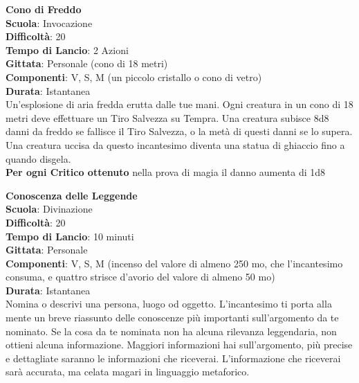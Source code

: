\begin{multicols}{2}
\medskip\textbf{Cono di Freddo}\\
\textbf{Scuola}: Invocazione\\
\textbf{Difficoltà}: 20\\
\textbf{Tempo di Lancio}: 2 Azioni\\
\textbf{Gittata}: Personale (cono di 18 metri)\\
\textbf{Componenti}: V, S, M (un piccolo cristallo o cono di vetro)\\
\textbf{Durata}: Istantanea\\
Un'esplosione di aria fredda erutta dalle tue mani. Ogni creatura in un cono di 18 metri deve effettuare un Tiro Salvezza su Tempra. Una creatura subisce 8d8 danni da freddo se fallisce il Tiro Salvezza, o la metà di questi danni se lo supera. Una creatura uccisa da questo incantesimo diventa una statua di ghiaccio fino a quando disgela.\\
\textbf{Per ogni Critico ottenuto} nella prova di magia il danno aumenta di 1d8

\medskip\textbf{Conoscenza delle Leggende}\\
\textbf{Scuola}: Divinazione\\
\textbf{Difficoltà}: 20\\
\textbf{Tempo di Lancio}: 10 minuti\\
\textbf{Gittata}: Personale\\
\textbf{Componenti}: V, S, M (incenso del valore di almeno 250 mo, che l'incantesimo consuma, e quattro strisce d'avorio del valore di almeno 50 mo)\\
\textbf{Durata}: Istantanea\\
Nomina o descrivi una persona, luogo od oggetto. L'incantesimo ti porta alla mente un breve riassunto delle conoscenze più importanti sull'argomento da te nominato. Se la cosa da te nominata non ha alcuna rilevanza leggendaria, non ottieni alcuna informazione. Maggiori informazioni hai sull'argomento, più precise e dettagliate saranno le informazioni che riceverai. L'informazione che riceverai sarà accurata, ma celata magari in linguaggio metaforico.


\end{multicols}
